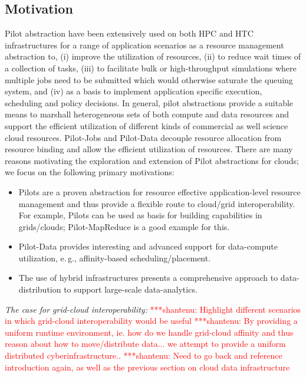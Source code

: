 \documentclass[times]{cpeauth}
\newcommand{\jhanote}[1]{ {\textcolor{red} { ***shantenu: #1 }}}
\newcommand{\jhanote}[1]{}
\newcommand{\pilot}{Pilot\xspace}
\newcommand{\pilots}{Pilots\xspace}
\newcommand{\pilotjobs}{Pilot-Jobs\xspace}
\newcommand{\pilotdata}{Pilot-Data\xspace}
\begin{document}
\subsection{Motivation}

\pilot abstraction have been extensively used on both HPC and HTC
infrastructures for a range of application scenarios as a resource
management abstraction to, (i) improve the utilization of resources,
(ii) to reduce wait times of a collection of tasks, (iii) to
facilitate bulk or high-throughput simulations where multiple jobs
need to be submitted which would otherwise saturate the queuing
system, and (iv) as a basis to implement application specific
execution, scheduling and policy decisions.  In general, pilot
abstractions provide a suitable means to marshall heterogeneous sets
of both compute and data resources and support the efficient
utilization of different kinds of commercial as well science cloud
resources.  \pilotjobs and \pilotdata decouple resource allocation
from resource binding and allow the efficient utilization of
resources.  There are many reasons motivating the exploration and
extension of \pilot abstractions for clouds; we focus on the following
primary motivations:

\begin{itemize}
\item \pilots are a proven abstraction for resource effective
  application-level resource management and thus provide a flexible
  route to cloud/grid interoperability. For example, \pilots can be used as 
  basis for building capabilities in grids/clouds; Pilot-MapReduce is a good 
  example for this.
\item \pilotdata provides interesting and advanced support for
  data-compute utilization, e.\,g., affinity-based scheduling/placement.
\item The use of hybrid infrastructures presents a comprehensive
  approach to data-distribution to support large-scale data-analytics.
\end{itemize}


{\it The case for grid-cloud interoperability:} \jhanote{Highlight
  different scenarios in which grid-cloud interoperability would be
  useful} \jhanote{By providing a uniform runtime environment, ie.
  how do we handle grid-cloud affinity and thus reason about how to
  move/distribute data... we attempt to provide a uniform distributed
  cyberinfrastructure..} \jhanote{Need to go back and reference
  introduction again, as well as the previous section on cloud data
  infrastructure}
\end{document}
